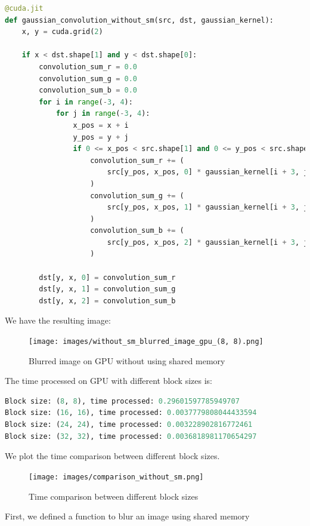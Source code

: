 \documentclass[12pt]{article}
\begin{document}
\begin{lstlisting}[language=Python]
@cuda.jit
def gaussian_convolution_without_sm(src, dst, gaussian_kernel):
    x, y = cuda.grid(2)

    if x < dst.shape[1] and y < dst.shape[0]:
        convolution_sum_r = 0.0
        convolution_sum_g = 0.0
        convolution_sum_b = 0.0
        for i in range(-3, 4):
            for j in range(-3, 4):
                x_pos = x + i
                y_pos = y + j
                if 0 <= x_pos < src.shape[1] and 0 <= y_pos < src.shape[0]:
                    convolution_sum_r += (
                        src[y_pos, x_pos, 0] * gaussian_kernel[i + 3, j + 3]
                    )
                    convolution_sum_g += (
                        src[y_pos, x_pos, 1] * gaussian_kernel[i + 3, j + 3]
                    )
                    convolution_sum_b += (
                        src[y_pos, x_pos, 2] * gaussian_kernel[i + 3, j + 3]
                    )

        dst[y, x, 0] = convolution_sum_r
        dst[y, x, 1] = convolution_sum_g
        dst[y, x, 2] = convolution_sum_b
\end{lstlisting}

\noindent
We have the resulting image:
\begin{figure}[H]
\centering
    \texttt{[image: images/without\_sm\_blurred\_image\_gpu\_(8, 8).png]}
    \caption{Blurred image on GPU without using shared memory}
\end{figure}

\noindent
The time processed on GPU with different block sizes is:

\begin{lstlisting}[language=Python]
Block size: (8, 8), time processed: 0.29601597785949707
Block size: (16, 16), time processed: 0.0037779808044433594
Block size: (24, 24), time processed: 0.003228902816772461
Block size: (32, 32), time processed: 0.0036818981170654297
\end{lstlisting}

\noindent
We plot the time comparison between different block sizes. 

\begin{figure}[H]
\centering
    \texttt{[image: images/comparison\_without\_sm.png]}
    \caption{Time comparison between different block sizes}
\end{figure}

\noindent
First, we defined a function to blur an image using shared memory
\end{document}
